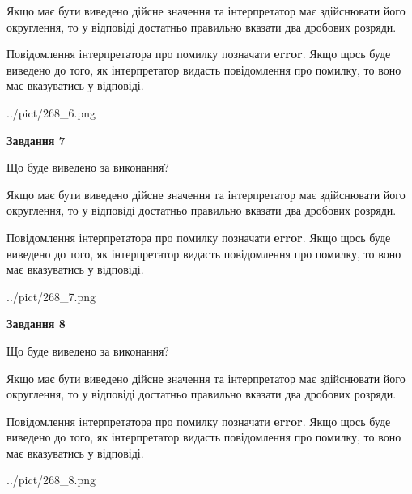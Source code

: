 \documentclass[12pt, ukrainian]{article}
\begin{document}
{\begin {Large}
Якщо має бути виведено дійсне значення та інтерпретатор має здійснювати його округлення, 
то у відповіді достатньо правильно вказати два дробових розряди.

Повідомлення інтерпретатора про помилку позначати \textbf{error}.
Якщо щось буде виведено до того, як інтерпретатор видасть повідомлення про помилку, 
то воно має вказуватись у відповіді. \par

\begin{center}
	{../pict/268_6.png}
\end{center}
\newpage

{\begin {center}\textbf{Завдання 7}\end {center}}\par
Що буде виведено за виконання? \par

Якщо має бути виведено дійсне значення та інтерпретатор має здійснювати його округлення, 
то у відповіді достатньо правильно вказати два дробових розряди.

Повідомлення інтерпретатора про помилку позначати \textbf{error}.
Якщо щось буде виведено до того, як інтерпретатор видасть повідомлення про помилку, 
то воно має вказуватись у відповіді. \par

\begin{center}
	{../pict/268_7.png}
\end{center}
\newpage

{\begin {center}\textbf{Завдання 8}\end {center}}\par
Що буде виведено за виконання? \par

Якщо має бути виведено дійсне значення та інтерпретатор має здійснювати його округлення, 
то у відповіді достатньо правильно вказати два дробових розряди.

Повідомлення інтерпретатора про помилку позначати \textbf{error}.
Якщо щось буде виведено до того, як інтерпретатор видасть повідомлення про помилку, 
то воно має вказуватись у відповіді. \par

\begin{center}
	{../pict/268_8.png}
\end{center}
\newpage


\end{Large}}
\end{document}
